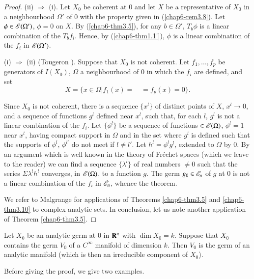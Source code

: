 \begin{proof}
(ii) $\Rightarrow$ (i). Let $X_{0}$ be coherent at $0$ and let $X$ be a representative of $X_{0}$ in a neighbourhood $\Omega'$ of $0$ with the property given in (\ref{chap6-rem3.8}). Let $\phi\in \mathscr{E}(\Omega')$, $\phi=0$ on $X$. By (\ref{chap6-thm3.5}), for any $b\in \Omega'$, $T_{b}\phi$ is a linear combination of the $T_{b}f_{i}$. Hence, by (\ref{chap6-thm1.1'}), $\phi$ is a linear combination of the $f_{i}$ in $\mathscr{E}(\Omega')$.

(i) $\Rightarrow$ (ii) (Tougeron \cite{J. C. Tougeron :1}). Suppose that $X_{0}$ is not coherent. Let $f_{1},\ldots,f_{p}$ be generators of $I(X_{0})$, $\Omega$ a neighbourhood of $0$ in which the $f_{i}$ are defined, and set
$$
X=\{x\in \Omega|f_{1}(x)=\quad = f_{p}(x)=0\}.
$$

Since $X_{0}$ is not coherent, there is a sequence $\{x^{l}\}$ of distinct points of $X$, $x^{l}\to 0$, and a sequence of functions $g^{l}$ defined near $x^{l}$, such that, for each $l$, $g^{l}$ is not a linear combination of the $f_{i}$. Let $\{\phi^{l}\}$ be a sequence of functions $\in \mathscr{E}(\Omega)$, $\phi^{l}=1$ near $x^{l}$, having compact support in $\Omega$ and in the set where $g^{l}$ is defined such that the supports of $\phi^{l}$, $\phi^{l'}$ do not meet if $l\neq l'$. Let $h^{l}=\phi^{l}g^{l}$, extended to $\Omega$ by $0$. By an argument which is well known in the theory of Fr\'echet spaces (which we leave to the reader) we can find a sequence $\{\lambda^{l}\}$ of real numbers $\neq 0$ such that the series $\Sigma \lambda^{l}h^{l}$ converges, in $\mathscr{E}(\Omega)$, to a function $g$. The germ $g_{0}\in \mathscr{E}_{n}$ of $g$ at $0$ is not a linear combination of the $f_{i}$ in $\mathscr{E}_{n}$, whence the theorem.

We refer to Malgrange \cite{B. Malgrange : 3} for applications of Theorems \ref{chap6-thm3.5} and \ref{chap6-thm3.10} to complex analytic sets. In conclusion, let us note another application of Theorem \ref{chap6-thm3.5}.
\end{proof}

\begin{proposition}\label{chap6-prop3.11}
Let $X_{0}$ be an analytic germ at $0$ in $\mathbf{R}^{n}$ with $\dim X_{0}=k$. Suppose that $X_{0}$ contains the germ $V_{0}$ of a $C^{\infty}$ manifold of dimension $k$. Then $V_{0}$ is the germ of an analytic manifold (which is then an irreducible component of $X_{0}$).
\end{proposition}

Before giving the proof, we give two examples.

